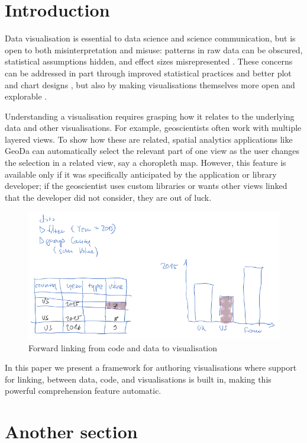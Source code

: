 \section{Introduction}

Data visualisation is essential to data science and science communication, but
is open to both misinterpretation and misuse: patterns in raw data can be
obscured, statistical assumptions hidden, and effect sizes misrepresented
\cite{weissgerber15}. These concerns can be addressed in part through improved
statistical practices and better plot and chart designs \cite{allen19}, but also
by making visualisations themselves more open and explorable
\cite{dragicevic19}.

Understanding a visualisation requires grasping how it relates to the underlying
data and other visualisations. For example, geoscientists often work with
multiple layered views. To show how these are related, spatial analytics
applications like GeoDa \cite{anselin06} can automatically select the relevant
part of one view as the user changes the selection in a related view, say a
choropleth map. However, this feature is available only if it was specifically
anticipated by the application or library developer; if the geoscientist uses
custom libraries or wants other views linked that the developer did not
consider, they are out of luck.

\begin{figure}[H]
\includegraphics[scale=0.35]{image/chart-fwd}
\caption{Forward linking from code and data to visualisation}
\end{figure}

In this paper we present a framework for authoring visualisations where support
for linking, between data, code, and visualisations is built in, making this
powerful comprehension feature automatic.

\section{Another section}

